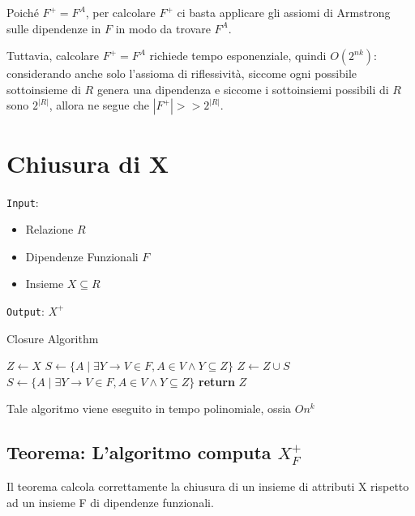 \documentclass{article}
\begin{document}
    \begin{tcolorbox}[colback=white!20!white,colframe=green!70!black, title=Nota]
      Poiché $F^{+} = F^{A}$, per calcolare $F^{+}$ ci basta applicare gli assiomi di Armstrong sulle dipendenze in $F$ in modo da trovare $F^{A}$. \par Tuttavia, calcolare $F^{+} = F^{A}$ richiede tempo esponenziale, quindi $O(2^{nk})$: considerando anche solo l'assioma di riflessività, siccome ogni possibile sottoinsieme di $R$ genera una dipendenza e siccome i sottoinsiemi possibili di $R$ sono $2^{|R|}$, allora ne segue che $|F^{+}| >> 2^{|R|}$.
    \end{tcolorbox}

    




\pagebreak
\section{Chiusura di X}
\texttt{Input}:
\begin{itemize}
  \item Relazione $R$
  \item Dipendenze Funzionali $F$
  \item Insieme $X \subseteq R$
\end{itemize}
\texttt{Output}: $X^{+}$\\

\begin{algorithm}
  \caption{Closure Algorithm}  
    \begin{algorithmic}[1]
  \State $Z \gets X$
  \State $S \gets \{A \mid \exists Y \rightarrow V \in F, A \in V \land Y \subseteq Z\}$
    \State $Z \gets Z \cup S$
    \State $S \gets \{A \mid \exists Y \rightarrow V \in F, A \in V \land Y \subseteq Z\}$
  \EndWhile
  \State \textbf{return} $Z$
  \end{algorithmic}
\end{algorithm}
Tale algoritmo viene eseguito in tempo polinomiale, ossia $On^{k}$

\subsection{Teorema: L'algoritmo computa $X_{F}^{+}$}
Il teorema calcola correttamente la chiusura di un insieme di attributi X rispetto ad un insieme F di dipendenze funzionali.
\end{document}
